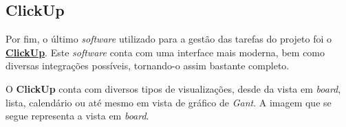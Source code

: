 \subsection{ClickUp}

Por fim, o último \textit{software} utilizado para a gestão das tarefas do projeto foi o \textbf{\href{https://clickup.com}{ClickUp}}. Este \textit{software} conta com uma interface mais moderna, bem como diversas integrações possíveis, tornando-o assim bastante completo.

O \textbf{ClickUp} conta com diversos tipos de visualizações, desde da vista em \textit{board}, lista, calendário ou até mesmo em vista de gráfico de \textit{Gant}. A imagem que se segue representa a vista em \textit{board}.

